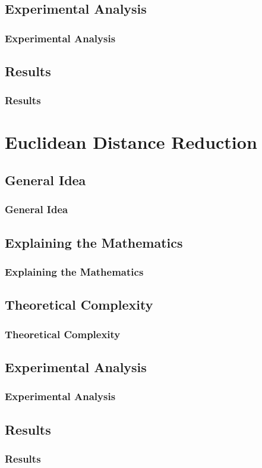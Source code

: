 \documentclass{beamer}
\begin{document}
\subsection{Experimental Analysis}
\begin{frame}
  \frametitle{Experimental Analysis}
\end{frame}
\subsection{Results}
\begin{frame}
  \frametitle{Results}
\end{frame}

\section{Euclidean Distance Reduction}

\subsection{General Idea}
\begin{frame}
  \frametitle{General Idea}
\end{frame}
\subsection{Explaining the Mathematics}
\begin{frame}
  \frametitle{Explaining the Mathematics}
\end{frame}
\subsection{Theoretical Complexity}
\begin{frame}
  \frametitle{Theoretical Complexity}
\end{frame}
\subsection{Experimental Analysis}
\begin{frame}
  \frametitle{Experimental Analysis}
\end{frame}
\subsection{Results}
\begin{frame}
  \frametitle{Results}
\end{frame}
\end{document}
